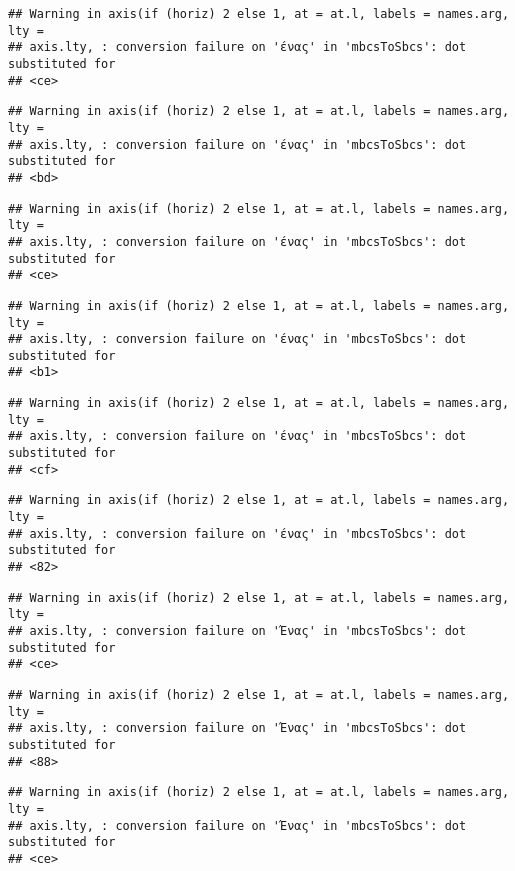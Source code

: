 \documentclass[
]{article}
\begin{document}
\begin{verbatim}
## Warning in axis(if (horiz) 2 else 1, at = at.l, labels = names.arg, lty =
## axis.lty, : conversion failure on 'ένας' in 'mbcsToSbcs': dot substituted for
## <ce>
\end{verbatim}

\begin{verbatim}
## Warning in axis(if (horiz) 2 else 1, at = at.l, labels = names.arg, lty =
## axis.lty, : conversion failure on 'ένας' in 'mbcsToSbcs': dot substituted for
## <bd>
\end{verbatim}

\begin{verbatim}
## Warning in axis(if (horiz) 2 else 1, at = at.l, labels = names.arg, lty =
## axis.lty, : conversion failure on 'ένας' in 'mbcsToSbcs': dot substituted for
## <ce>
\end{verbatim}

\begin{verbatim}
## Warning in axis(if (horiz) 2 else 1, at = at.l, labels = names.arg, lty =
## axis.lty, : conversion failure on 'ένας' in 'mbcsToSbcs': dot substituted for
## <b1>
\end{verbatim}

\begin{verbatim}
## Warning in axis(if (horiz) 2 else 1, at = at.l, labels = names.arg, lty =
## axis.lty, : conversion failure on 'ένας' in 'mbcsToSbcs': dot substituted for
## <cf>
\end{verbatim}

\begin{verbatim}
## Warning in axis(if (horiz) 2 else 1, at = at.l, labels = names.arg, lty =
## axis.lty, : conversion failure on 'ένας' in 'mbcsToSbcs': dot substituted for
## <82>
\end{verbatim}

\begin{verbatim}
## Warning in axis(if (horiz) 2 else 1, at = at.l, labels = names.arg, lty =
## axis.lty, : conversion failure on 'Ένας' in 'mbcsToSbcs': dot substituted for
## <ce>
\end{verbatim}

\begin{verbatim}
## Warning in axis(if (horiz) 2 else 1, at = at.l, labels = names.arg, lty =
## axis.lty, : conversion failure on 'Ένας' in 'mbcsToSbcs': dot substituted for
## <88>
\end{verbatim}

\begin{verbatim}
## Warning in axis(if (horiz) 2 else 1, at = at.l, labels = names.arg, lty =
## axis.lty, : conversion failure on 'Ένας' in 'mbcsToSbcs': dot substituted for
## <ce>
\end{verbatim}
\end{document}
